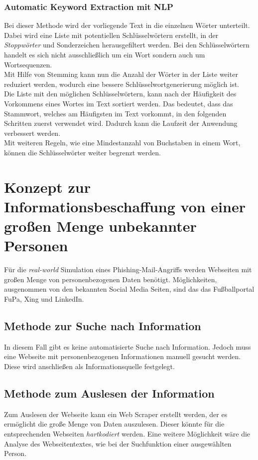 		\subsubsection{Automatic Keyword Extraction mit NLP}
		\label{sec:Automatic Keyword Extraction}
		Bei dieser Methode wird der vorliegende Text in die einzelnen Wörter unterteilt. Dabei wird eine Liste mit potentiellen Schlüsselwörtern erstellt, in der \textit{Stoppwörter} und Sonderzeichen herausgefiltert werden. Bei den Schlüsselwörtern handelt es sich nicht ausschließlich um ein Wort sondern auch um Wortsequenzen.\\
		Mit Hilfe von Stemming kann nun die Anzahl der Wörter in der Liste weiter reduziert werden, wodurch eine bessere Schlüsselwortgenerierung möglich ist. \\
		Die Liste mit den möglichen Schlüsselwörtern, kann nach der Häufigkeit des Vorkommens eines Wortes im Text sortiert werden. Das bedeutet, dass das Stammwort, welches am Häufigsten im Text vorkommt, in den folgenden Schritten zuerst verwendet wird. Dadurch kann die Laufzeit der Anwendung verbessert werden.\\
		Mit weiteren Regeln, wie eine Mindestanzahl von Buchstaben in einem Wort, können die Schlüsselwörter weiter begrenzt werden. 

	
\section{Konzept zur Informationsbeschaffung von einer großen Menge unbekannter Personen}
Für die \textit{real-world} Simulation eines Phishing-Mail-Angriffs werden Webseiten mit großen Menge von personenbezogenen Daten benötigt. Möglichkeiten, ausgenommen von den bekannten Social Media Seiten, sind das das Fußballportal FuPa, Xing und LinkedIn.\\
	\subsection{Methode zur Suche nach Information}
	In diesem Fall gibt es keine automatisierte Suche nach Information. Jedoch muss eine Webseite mit personenbezogenen Informationen manuell gesucht werden. Diese wird anschließen als Informationsquelle festgelegt.
	\subsection{Methode zum Auslesen der Information}
	Zum Auslesen der Webseite kann ein Web Scraper erstellt werden, der es ermöglicht die große Menge von Daten auszulesen. Dieser könnte für die entsprechenden Webseiten \textit{hartkodiert} werden. Eine weitere Möglichkeit wäre die Analyse des Webseitentextes, wie bei der Suchfunktion einer ausgewählten Person.

